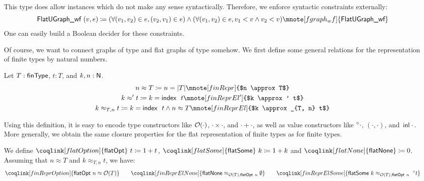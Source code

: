 This type does allow instances which do not make any sense syntactically. Therefore, we enforce syntactic constraints externally:
\[\textsf{FlatUGraph\_wf}~(v, e) \defeq (\forall (v_1, v_2) \in e, (v_2, v_1) \in e) \land (\forall (v_1, v_2) \in e, v_1 < v \land v_2 < v)\mnote[fgraph_wf]{\textsf{FlatUGraph\_wf}} \]
One can easily build a Boolean decider for these constraints. 

Of course, we want to connect graphs of type \UGraph{} and flat graphs of type \FlatUGraph{} somehow. We first define some general relations for the representation of finite types by natural numbers. 

\begin{definition}
  Let $T : \textsf{finType}$, $t : T$, and $k, n : \mathsf{N}$. 
  \begin{gather*}
    n \approx T \defeq n = \length{T} \mnote[finRepr]{$n \approx T$}\\
    k \approx' t \defeq k = \findex~t \mnote[finReprEl']{$k \approx' t$}\\
    k \approx_{T, n} t \defeq k = \findex~t \land n \approx T \mnote[finReprEl]{$k \approx_{T, n} t$}
  \end{gather*}
\end{definition}

Using this definition, it is easy to encode type constructors like $\mathcal{O}{(\cdot)}$, $\cdot \times \cdot$, and $\cdot + \cdot$, as well as value constructors like $\prescript{\circ}{}\cdot$, $( \cdot, \cdot)$, and $\textsf{inl}~\cdot$. More generally, we obtain the same closure properties for the flat representation of finite types as for finite types.

\begin{example}
  We define $\coqlink[flatOption]{\textsf{flatOpt}}~t \defeq \natS{t}$, $\coqlink[flatSome]{\textsf{flatSome}}~k \defeq \natS{k}$ and $\coqlink[flatNone]{\textsf{flatNone}} \defeq 0$. 
  Assuming that $n \approx T$ and $k \approx_{T, n} t$, we have:
  \begin{align*}
    \coqlink[finReprOption]{\textsf{flatOpt}~n \approx \opt{T}}
    \qquad \coqlink[finReprElNone]{\textsf{flatNone} \approx_{\opt{T}, \textsf{flatOpt}~n} \ONone}
    \qquad \coqlink[finReprElSome]{\textsf{flatSome}~k \approx_{\opt{T}, \textsf{flatOpt}~n}~\OSome{t}} 
  \end{align*}
\end{example}

